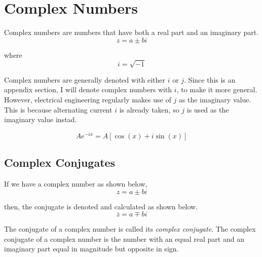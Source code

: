 \section{Complex Numbers}\label{app:Complex Numbers}
Complex numbers are numbers that have both a real part and an imaginary part.
\begin{equation}\label{eq:Complex_Number}
  z = a \pm bi
\end{equation}

where
\begin{equation}\label{eq:Imaginary_Value}
  i = \sqrt{-1}
\end{equation}

\begin{remark*}
  Complex numbers are generally denoted with either $i$ or $j$.
  Since this is an appendix section, I will denote complex numbers with $i$, to make it more general.
  However, electrical engineering regularly makes use of $j$ as the imaginary value.
  This is because alternating current $i$ is already taken, so $j$ is used as the imaginary value instad.
\end{remark*}

\begin{equation} \label{eq:Exponential to Rectangular}
  A e^{-ix} = A \left[ \cos \left( x \right) + i\sin \left( x \right) \right]
\end{equation}

\subsection{Complex Conjugates}\label{app:Complex_Conjugates}
If we have a complex number as shown below,
\begin{equation*}
  z = a \pm bi
\end{equation*}

then, the conjugate is denoted and calculated as shown below.
\begin{equation}\label{eq:Complex_Conjugates}
  \overline{z} = a \mp bi
\end{equation}

\begin{definition}
  The conjugate of a complex number is called its \emph{complex conjugate}.
  The complex conjugate of a complex number is the number with an equal real part and an imaginary part equal in magnitude but opposite in sign.
\end{definition}

